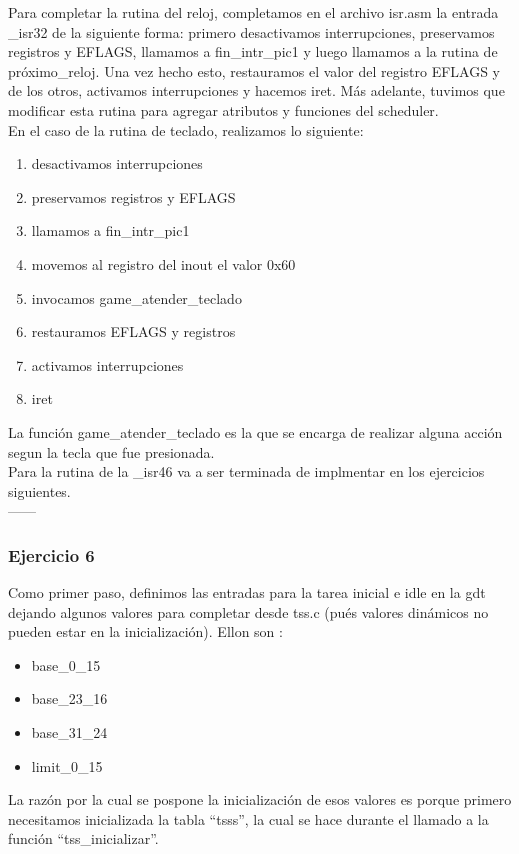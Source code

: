 
\indent Para completar la rutina del reloj, completamos en el archivo isr.asm la entrada \_isr32 de la siguiente forma: primero desactivamos interrupciones, preservamos registros y EFLAGS,  llamamos a fin\_intr\_pic1 y luego llamamos a la rutina de pr\'oximo\_reloj. Una vez hecho esto, restauramos el valor del registro EFLAGS y de los otros, activamos interrupciones y hacemos iret. Más adelante, tuvimos que modificar esta rutina para agregar atributos y funciones del scheduler.\\

En el caso de la rutina de teclado, realizamos lo siguiente:
\begin{enumerate}
	\item desactivamos interrupciones
	\item preservamos registros y EFLAGS
	\item llamamos a fin\_intr\_pic1
	\item movemos al registro del inout el valor 0x60
	\item invocamos game_atender_teclado
	\item restauramos EFLAGS y registros
	\item activamos interrupciones
	\item iret
\end{enumerate}

La funci\'on game_atender_teclado es la que se encarga de realizar alguna acci\'on segun la tecla que fue presionada.\\

Para la rutina de la \_isr46 va a ser terminada de implmentar en los ejercicios siguientes.\\

------
\subsubsection{Ejercicio 6}
\indent Como primer paso, definimos las entradas para la tarea inicial e idle en la gdt dejando algunos valores para completar desde tss.c (pu\'es valores din\'amicos no pueden estar en la inicializaci\'on). Ellon son :\\
\begin{itemize}
	\item base\_0\_15
	\item base\_23\_16
	\item base\_31\_24
	\item limit\_0\_15
\end{itemize}
La raz\'on por la cual se pospone la inicializaci\'on de esos valores es porque primero necesitamos inicializada la tabla ``tsss'', la cual se hace durante el llamado a la funci\'on ``tss\_inicializar''.\\


